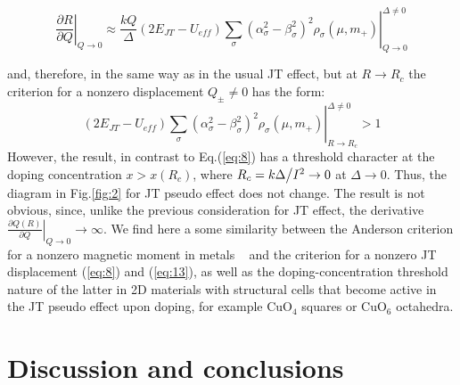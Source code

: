 \documentclass[%
 reprint,
groupedaddress,
 amsmath,amssymb,
 aps,
prb,
]{revtex4-1}
\begin{document}
\begin{widetext}
\begin{equation}
\left. {\frac{{\partial R}}{{\partial Q}}} \right|_{Q \to 0}  \approx \frac{{kQ}}{\Delta }\left( {2E_{JT}  - U_{eff} } \right)\left. {\sum\limits_\sigma  {\left( {\alpha _\sigma ^2  - \beta _\sigma ^2 } \right)^2 \rho _\sigma ^{} \left( {\mu ,m_ +  } \right)} } \right|_{Q \to 0}^{\Delta  \ne 0}
\label{eq:12}
\end{equation}
\end{widetext}
and, therefore, in the same way as in the usual JT effect, but at $R \to R_c$ the criterion for a nonzero displacement $Q_ \pm   \ne 0$ has the form:
\begin{equation}
\left( {2E_{JT}  - U_{eff} } \right)\left. {\sum\limits_\sigma  {\left( {\alpha _\sigma ^2  - \beta _\sigma ^2 } \right)^2 \rho _\sigma ^{} \left( {\mu ,m_ +  } \right)} } \right|_{R \to R_c }^{\Delta  \ne 0}  > 1
\label{eq:13}
\end{equation}
However, the result, in contrast to Eq.(\ref{eq:8}) has a threshold character at the doping concentration $x > x\left( {R_c } \right)$, where  $R_c  = {{k\Delta } \mathord{\left/
 {\vphantom {{k\Delta } {I^2 }}} \right.
 \kern-\nulldelimiterspace} {I^2 }} \to 0$ at $\Delta  \to 0$. Thus, the diagram in Fig.\ref{fig:2} for JT pseudo effect does not change. The result is not obvious, since, unlike the previous consideration for JT effect, the derivative $\left. {\frac{{\partial Q\left( R \right)}}{{\partial Q}}} \right|_{Q \to 0}\rightarrow \infty$. We find here a some similarity between the Anderson criterion for a nonzero magnetic moment in metals ~\cite{Anderson1961} and the criterion for a nonzero JT displacement (\ref{eq:8}) and (\ref{eq:13}), as well as the doping-concentration threshold nature of the latter in 2D materials with structural cells that become active in the JT pseudo effect upon doping, for example CuO$_4$ squares or CuO$_6$ octahedra.


\section{\label{sec:IV} Discussion and conclusions  \\}
\end{document}
